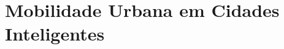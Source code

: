 %
%

\chapter{Mobilidade Urbana em Cidades Inteligentes}\label{chap:Mobilidade Urbana em Cidades Inteligentes} %

